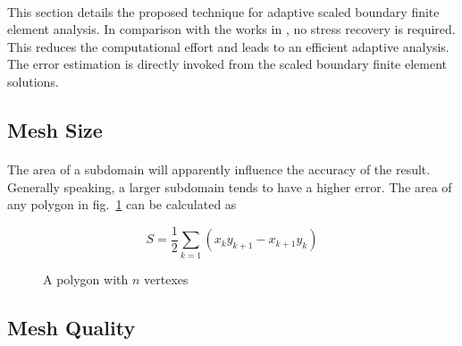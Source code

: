 \paragraph{}
This section details the proposed technique for adaptive scaled boundary finite element analysis. In comparison with the works in \cite{NME:NME439}, no stress recovery is required. This reduces the computational effort and leads to an efficient adaptive analysis. The error estimation is directly invoked from the scaled boundary finite element solutions.

\subsection{Mesh Size}
\paragraph{}
The area of a subdomain will apparently influence the accuracy of the result.
Generally speaking, a larger subdomain tends to have a higher error.
The area of any polygon in fig.~\ref{adap_fig:ei_polygon} can be calculated as 

\begin{equation}
    S = \frac{1}{2}
        \sum_{k=1}
        \left(
            x_k y_{k+1} - x_{k+1} y_k
        \right)
\end{equation}

\begin{figure}[h!]
    \centering
    \caption{A polygon with $n$ vertexes}
    \label{adap_fig:ei_polygon}
\end{figure}

\subsection{Mesh Quality}
